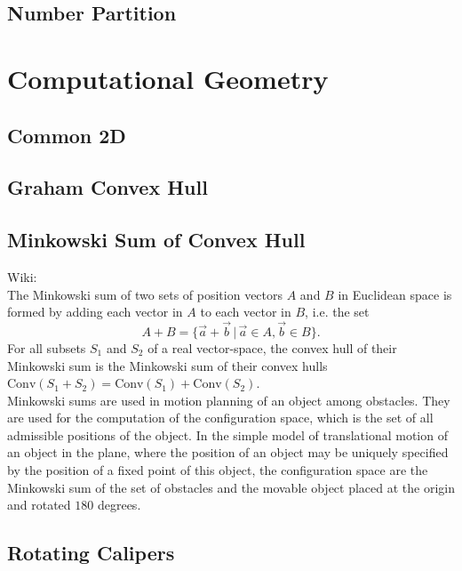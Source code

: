 \documentclass[10pt]{article}
\begin{document}
\subsection{Number Partition} {

\section{Computational Geometry}
\subsection{Common 2D}

\subsection{Graham Convex Hull}

\subsection{Minkowski Sum of Convex Hull}
\noindent
Wiki: \\
The Minkowski sum of two sets of position vectors $A$ and $B$ in Euclidean space is formed by adding each vector in $A$ to each vector in $B$, i.e. the set
\begin{displaymath}
A+B=\{ \vec{a} + \vec{b} \, | \, \vec{a} \in A, \vec{b} \in B \}.
\end{displaymath}
For all subsets $S_1$ and $S_2$ of a real vector-space, the convex hull of their Minkowski sum is the Minkowski sum of their convex hulls $\mathrm{Conv} (S_1 + S_2) = \mathrm{Conv} (S_1) + \mathrm{Conv} (S_2)$. \\
Minkowski sums are used in motion planning of an object among obstacles. They are used for the computation of the configuration space, which is the set of all admissible positions of the object. In the simple model of translational motion of an object in the plane, where the position of an object may be uniquely specified by the position of a fixed point of this object, the configuration space are the Minkowski sum of the set of obstacles and the movable object placed at the origin and rotated $180$ degrees. \\

\subsection{Rotating Calipers}

}
\end{document}
